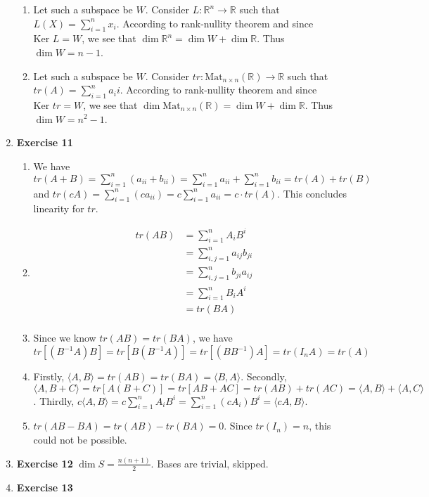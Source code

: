 \documentclass[11pt]{article}
\begin{document}
\begin{enumerate}
\begin{enumerate}
\item Let such a subspace be \(W\). Consider \(L:\mathbb{R}^n\rightarrow \mathbb{R}\) such that \(L(X)=\sum\limits_{i=1}^n x_i\). According to rank-nullity theorem and since \(\text{Ker }L=W\), we see that \(\dim \mathbb{R}^n=\dim W+\dim \mathbb{R}\). Thus \(\dim W=n-1\).
\item Let such a subspace be \(W\). Consider \(tr:\text{Mat}_{n\times n}(\mathbb{R})\rightarrow \mathbb{R}\) such that \(tr(A)=\sum\limits_{i=1}^n a_ii\). According to rank-nullity theorem and since \(\text{Ker }tr=W\), we see that \(\dim \text{Mat}_{n\times n}(\mathbb{R})=\dim W+\dim \mathbb{R}\). Thus \(\dim W=n^2-1\).
\end{enumerate}
\item \textbf{Exercise 11}
\label{sec:org7b891ec}
\begin{enumerate}
\item We have \(tr(A+B)=\sum\limits_{i=1}^n(a_{ii}+b_{ii})=\sum\limits_{i=1}^n a_{ii}+\sum\limits_{i=1}^n b_{ii}=tr(A)+tr(B)\) and \(tr(cA)=\sum\limits_{i=1}^n(ca_{ii})=c\sum\limits_{i=1}^n a_{ii}=c\cdot tr(A)\). This concludes linearity for \(tr\).
\item $$\begin{aligned}
   tr(AB)&=\sum\limits_{i=1}^n A_iB^i\\
   &=\sum\limits_{i,j=1}^n a_{ij}b_{ji}\\
   &=\sum\limits_{i,j=1}^n b_{ji}a_{ij}\\
   &=\sum\limits_{i=1}^{n} B_iA^i\\
   &=tr(BA)\\
   \end{aligned}$$
\item Since we know \(tr(AB)=tr(BA)\), we have \(tr[(B^{-1}A)B]=tr[B(B^{-1}A)]=tr[(BB^{-1})A]=tr(I_nA)=tr(A)\)
\item Firstly, \(\langle A,B \rangle = tr(AB)=tr(BA)=\langle B,A \rangle\). Secondly, \(\langle A,B+C \rangle=tr[A(B+C)]=tr[AB+AC]=tr(AB)+tr(AC)=\langle A,B\rangle+\langle A,C\rangle\). Thirdly, \(c\langle A,B \rangle=c\sum\limits_{i=1}^n A_iB^i=\sum\limits_{i=1}^n (cA_i)B^i=\langle cA,B \rangle\).
\item \(tr(AB-BA)=tr(AB)-tr(BA)=0\). Since \(tr(I_n)=n\), this could not be possible.
\end{enumerate}
\item \textbf{Exercise 12}
\label{sec:orge4b1862}
\(\dim S=\frac{n(n+1)}{2}\). Bases are trivial, skipped.
\item \textbf{Exercise 13}
\label{sec:org99dc3bc}


\end{enumerate}
\end{document}
